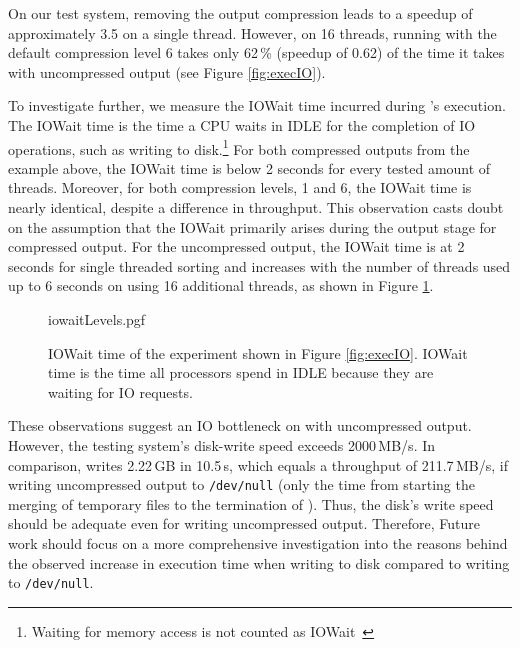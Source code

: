 On our test system, removing the output compression leads to a speedup of approximately 3.5 on a single thread. However, on 16 threads, running \sort with the default compression level 6 takes only 62\,\% (speedup of 0.62) of the time it takes with uncompressed output (see Figure \ref{fig:execIO}).

To investigate further, we measure the IOWait time incurred during \sort's execution. The IOWait time is the time a CPU waits in IDLE for the completion of IO operations, such as writing to disk.\footnote{Waiting for memory access is not counted as IOWait~\cite{noauthor_iostat1_nodate}} For both compressed outputs from the example above, the IOWait time is below 2 seconds for every tested amount of threads. Moreover, for both compression levels, 1 and 6, the IOWait time is nearly identical, despite a difference in throughput. This observation casts doubt on the assumption that the IOWait primarily arises during the output stage for compressed output. For the uncompressed output, the IOWait time is at 2 seconds for single threaded sorting and increases with the number of threads used up to 6 seconds on using 16 additional threads, as shown in Figure \ref{fig:iowait}.
\begin{figure}[htb]
        {iowaitLevels.pgf}
    \caption{IOWait time of the experiment shown in Figure \ref{fig:execIO}. IOWait time is the time all processors spend in IDLE because they are waiting for IO requests. \threads \points 
    }
    \label{fig:iowait}
\end{figure}

These observations suggest an IO bottleneck on \sort with uncompressed output. However, the testing system's disk-write speed exceeds 2000\,MB/s. In comparison, \sort writes 2.22\,GB in 10.5\,s, which equals a throughput of 211.7\,MB/s, if writing uncompressed output to \texttt{/dev/null} (only the time from starting the merging of temporary files to the termination of \sort). Thus, the disk's write speed should be adequate even for writing uncompressed output. Therefore, Future work should focus on a more comprehensive investigation into the reasons behind the observed increase in execution time when writing to disk compared to writing to \texttt{/dev/null}.



